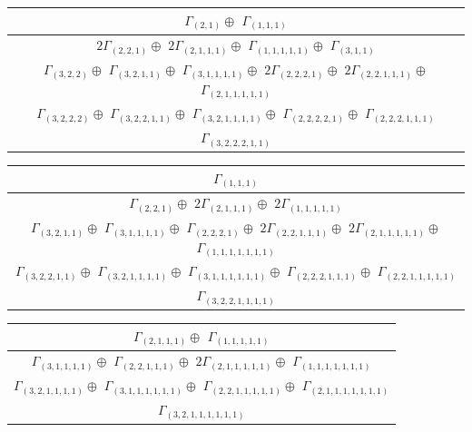 \documentclass[main.tex]{subfiles}
\begin{document}
\bigskip
\begin{minipage}{1\textwidth}
\centering
\begin{tabular}{c}
$\Gamma_{(
2 , 
1
)} \oplus$
$\Gamma_{(
1 , 
1 , 
1
)}$
\\ \hline
$2\Gamma_{(
2 , 
2 , 
1
)} \oplus$
$2\Gamma_{(
2 , 
1 , 
1 , 
1
)} \oplus$
$\Gamma_{(
1 , 
1 , 
1 , 
1 , 
1
)} \oplus$
$\Gamma_{(
3 , 
1 , 
1
)} $
\\ \hline
$\Gamma_{(
3 , 
2 , 
2
)} \oplus$
$\Gamma_{(
3 , 
2 , 
1 , 
1
)} \oplus$
$\Gamma_{(
3 , 
1 , 
1 , 
1 , 
1
)} \oplus$
$2\Gamma_{(
2 , 
2 , 
2 , 
1
)} \oplus$
$2\Gamma_{(
2 , 
2 , 
1 , 
1 , 
1
)} \oplus$
$\Gamma_{(
2 , 
1 , 
1 , 
1 , 
1 , 
1
)}$
\\ \hline
$\Gamma_{(
3 , 
2 , 
2 , 
2
)} \oplus$
$\Gamma_{(
3 , 
2 , 
2 , 
1 , 
1
)} \oplus$
$\Gamma_{(
3 , 
2 , 
1 , 
1 , 
1 , 
1
)} \oplus$
$\Gamma_{(
2 , 
2 , 
2 , 
2 , 
1
)} \oplus$
$\Gamma_{(
2 , 
2 , 
2 , 
1 , 
1 , 
1
)}$
\\ \hline
$\Gamma_{(
3 , 
2 , 
2 , 
2 , 
1 , 
1
)}$
\\
\end{tabular}\end{minipage}
\bigskip
\begin{minipage}{1\textwidth}
\centering
\begin{tabular}{c}
$\Gamma_{(
1 , 
1 , 
1
)}$
\\ \hline
$\Gamma_{(
2 , 
2 , 
1
)} \oplus$
$2\Gamma_{(
2 , 
1 , 
1 , 
1
)} \oplus$
$2\Gamma_{(
1 , 
1 , 
1 , 
1 , 
1
)} 
$
\\ \hline
$\Gamma_{(
3 , 
2 , 
1 , 
1
)} \oplus$
$\Gamma_{(
3 , 
1 , 
1 , 
1 , 
1
)} \oplus$
$\Gamma_{(
2 , 
2 , 
2 , 
1
)} \oplus$
$2\Gamma_{(
2 , 
2 , 
1 , 
1 , 
1
)} \oplus$
$2\Gamma_{(
2 , 
1 , 
1 , 
1 , 
1 , 
1
)} \oplus$
$\Gamma_{(
1 , 
1 , 
1 , 
1 , 
1 , 
1 , 
1
)}$
\\ \hline
$\Gamma_{(
3 , 
2 , 
2 , 
1 , 
1
)} \oplus$
$\Gamma_{(
3 , 
2 , 
1 , 
1 , 
1 , 
1
)} \oplus$
$\Gamma_{(
3 , 
1 , 
1 , 
1 , 
1 , 
1 , 
1
)} \oplus$
$\Gamma_{(
2 , 
2 , 
2 , 
1 , 
1 , 
1
)} \oplus$
$\Gamma_{(
2 , 
2 , 
1 , 
1 , 
1 , 
1 , 
1
)}$
\\ \hline
$\Gamma_{(
3 , 
2 , 
2 , 
1 , 
1 , 
1 , 
1
)}$
\\
\end{tabular}\end{minipage}
\bigskip
\begin{minipage}{.6\textwidth}
\centering
\begin{tabular}{c}
$\Gamma_{(
2 , 
1 , 
1 , 
1
)} \oplus$
$\Gamma_{(
1 , 
1 , 
1 , 
1 , 
1
)}$
\\ \hline
$\Gamma_{(
3 , 
1 , 
1 , 
1 , 
1
)} \oplus$
$\Gamma_{(
2 , 
2 , 
1 , 
1 , 
1
)} \oplus$
$2\Gamma_{(
2 , 
1 , 
1 , 
1 , 
1 , 
1
)} \oplus$
$\Gamma_{(
1 , 
1 , 
1 , 
1 , 
1 , 
1 , 
1
)}$
\\ \hline
$\Gamma_{(
3 , 
2 , 
1 , 
1 , 
1 , 
1
)} \oplus$
$\Gamma_{(
3 , 
1 , 
1 , 
1 , 
1 , 
1 , 
1
)} \oplus$
$\Gamma_{(
2 , 
2 , 
1 , 
1 , 
1 , 
1 , 
1
)} \oplus$
$\Gamma_{(
2 , 
1 , 
1 , 
1 , 
1 , 
1 , 
1 , 
1
)}$
\\ \hline
$\Gamma_{(
3 , 
2 , 
1 , 
1 , 
1 , 
1 , 
1 , 
1
)}$
\\
\end{tabular}\end{minipage}
\end{document}
